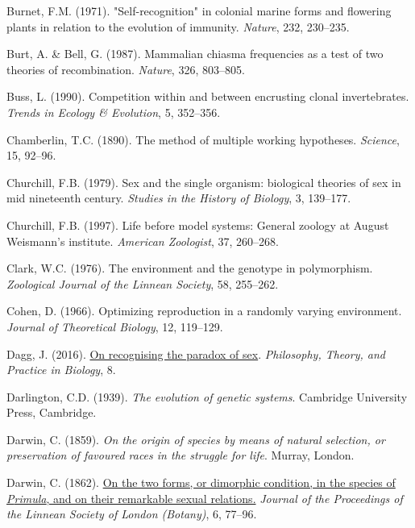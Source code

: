 \documentclass[
  letterpaper,
]{book}
\newlength{\cslhangindent}
\newenvironment{CSLReferences}[2] %
 {\begin{list}{}{%
  \setlength{\itemindent}{0pt}
  \setlength{\leftmargin}{0pt}
  \setlength{\parsep}{0pt}
  \ifodd #1
   \setlength{\leftmargin}{\cslhangindent}
   \setlength{\itemindent}{-1\cslhangindent}
  \fi
  \setlength{\itemsep}{#2\baselineskip}}}
 {\end{list}}
\begin{document}
\begin{CSLReferences}{1}{0}
Burnet, F.M. (1971). "Self-recognition" in colonial marine forms and
flowering plants in relation to the evolution of immunity.
\emph{Nature}, 232, 230--235.

Burt, A. \& Bell, G. (1987). Mammalian chiasma frequencies as a test of
two theories of recombination. \emph{Nature}, 326, 803--805.

Buss, L. (1990). Competition within and between encrusting clonal
invertebrates. \emph{Trends in Ecology \& Evolution}, 5, 352--356.

Chamberlin, T.C. (1890). The method of multiple working hypotheses.
\emph{Science}, 15, 92--96.

Churchill, F.B. (1979). Sex and the single organism: {b}iological
theories of sex in mid nineteenth century. \emph{Studies in the History
of Biology}, 3, 139--177.

Churchill, F.B. (1997). Life before model systems: General zoology at
{August Weismann's} institute. \emph{American Zoologist}, 37, 260--268.

Clark, W.C. (1976). The environment and the genotype in polymorphism.
\emph{Zoological Journal of the Linnean Society}, 58, 255--262.

Cohen, D. (1966). Optimizing reproduction in a randomly varying
environment. \emph{Journal of Theoretical Biology}, 12, 119--129.

Dagg, J. (2016). \href{https://doi.org/10.3998/ptb.6959004.0008.003}{On
recognising the paradox of sex}. \emph{Philosophy, Theory, and Practice
in Biology}, 8.

Darlington, C.D. (1939). \emph{The evolution of genetic systems}.
Cambridge University Press, Cambridge.

Darwin, C. (1859). \emph{On the origin of species by means of natural
selection, or preservation of favoured races in the struggle for life}.
Murray, London.

Darwin, C. (1862).
\href{https://doi.org/10.1111/j.1095-8312.1862.tb01218.x}{On the two
forms, or dimorphic condition, in the species of \emph{{P}rimula}, and
on their remarkable sexual relations.} \emph{Journal of the Proceedings
of the Linnean Society of London (Botany)}, 6, 77--96.


\end{CSLReferences}
\end{document}
